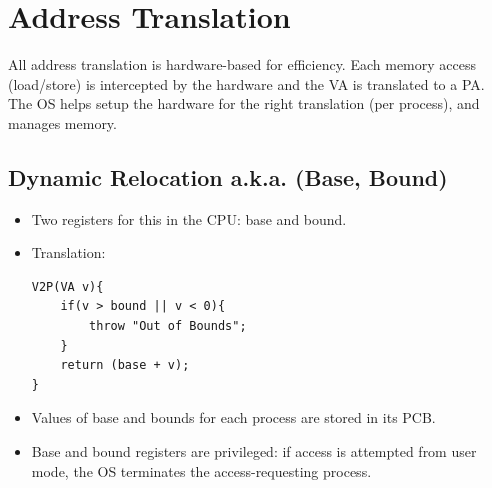 \documentclass[10pt]{report}
\begin{document}
\section{Address Translation}
All address translation is hardware-based for efficiency.
Each memory access (load/store) is intercepted by the hardware
and the VA is translated to a PA. The OS helps setup the
hardware for the right translation (per process), and manages memory.
\subsection{Dynamic Relocation a.k.a. (Base, Bound)}
\begin{itemize}
\item Two registers for this in the CPU: base and bound.
\item Translation:
\begin{lstlisting}
V2P(VA v){
    if(v > bound || v < 0){
        throw "Out of Bounds";
    }
    return (base + v);
}
\end{lstlisting}
\item Values of base and bounds for each process are stored in its
PCB.
\item Base and bound registers are privileged: if access is attempted
from user mode, the OS terminates the access-requesting process.
\end{itemize}
\end{document}
